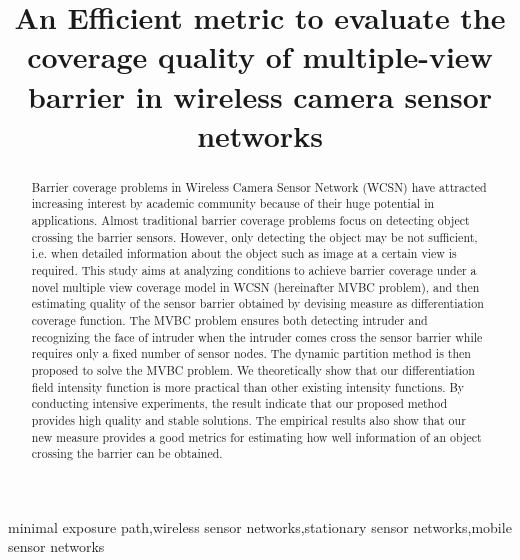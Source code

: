 \documentclass[3p]{elsarticle}
\begin{document}
\begin{frontmatter}

\title{ An Efficient metric to evaluate the coverage quality of multiple-view barrier in wireless camera sensor networks}


\begin{abstract}
Barrier coverage problems in Wireless Camera Sensor Network (WCSN) have attracted increasing interest by academic community because of their huge potential in applications. Almost traditional barrier coverage problems focus on detecting object crossing the barrier sensors. However, only detecting the object may be not sufficient, i.e. when detailed information about the object such as image at a certain view is required. This study aims at analyzing conditions to achieve barrier coverage under a novel multiple view coverage model in WCSN (hereinafter MVBC problem), and then estimating quality of the sensor barrier obtained by devising measure as differentiation coverage function. The MVBC problem ensures both detecting intruder and recognizing the face of intruder when the intruder comes cross the sensor barrier while requires only a fixed number of sensor nodes. The dynamic partition method is then proposed to solve the MVBC problem. We theoretically show that our differentiation field intensity function is more practical than other existing intensity functions. By conducting intensive experiments, the result indicate that our proposed method provides high quality and stable solutions. The empirical results also show that our new measure provides a good metrics for estimating how well information of an object crossing the barrier can be obtained.
\end{abstract}

\begin{keyword}
minimal exposure path\sep wireless sensor networks\sep stationary sensor networks\sep mobile sensor networks
\end{keyword}

\end{frontmatter}
\end{document}
